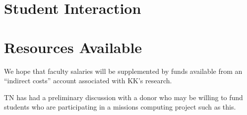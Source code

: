 \documentclass{article}
\begin{document}

\section{Student Interaction}
\label{sec:student-interaction}





\section{Resources Available}
\label{sec:resources-available}



We hope that faculty salaries will be supplemented
by funds available from
an ``indirect costs'' account associated with KK's research.

TN has had a preliminary discussion with a donor
who may be willing to fund students who are
participating in a missions computing project
such as this.
\end{document}
